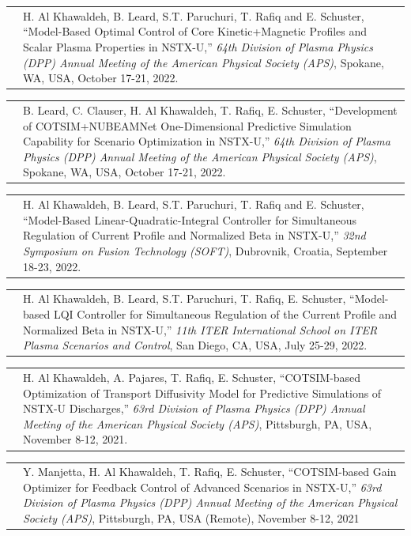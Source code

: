 \documentclass[11pt,letterpaper]{article}
\makeatletter
\newcommand{\CVSection}[1]{%
  \vspace{0.4em}
  \noindent
  \begin{tabularx}{\textwidth}{@{}p{0.82in}@{\hspace{0.14in}}X@{}}
    \raisebox{-1.45ex}{\color{rulecolor}\rule{0.82in}{4.2pt}} &
    {\fontsize{14}{16}\selectfont\color{cvcolor}#1}\\
  \end{tabularx}
  \vspace{0.55em}
}
\newcommand{\CVItem}[2]{%
  \begin{tabularx}{\textwidth}{@{}p{0.83in}@{\hspace{0.15in}}X@{}}
    \raggedleft{#1} & #2\\[3pt]
  \end{tabularx}
}
\makeatother
\begin{document}
\CVItem{[17]}{H. Al Khawaldeh, B. Leard, S.T. Paruchuri, T. Rafiq and E. Schuster, ``Model-Based Optimal Control of Core Kinetic+Magnetic Profiles and Scalar Plasma Properties in NSTX-U,'' \textit{64th Division of Plasma Physics (DPP) Annual Meeting of the American Physical Society (APS)}, Spokane, WA, USA, October 17-21, 2022.}

\CVItem{[18]}{B. Leard, C. Clauser, H. Al Khawaldeh, T. Rafiq, E. Schuster, ``Development of COTSIM+NUBEAMNet One-Dimensional Predictive Simulation Capability for Scenario Optimization in NSTX-U,'' \textit{64th Division of Plasma Physics (DPP) Annual Meeting of the American Physical Society (APS)}, Spokane, WA, USA, October 17-21, 2022.}

\CVItem{[19]}{H. Al Khawaldeh, B. Leard, S.T. Paruchuri, T. Rafiq and E. Schuster, ``Model-Based Linear-Quadratic-Integral Controller for Simultaneous Regulation of Current Profile and Normalized Beta in NSTX-U,'' \textit{32nd Symposium on Fusion Technology (SOFT)}, Dubrovnik, Croatia, September 18-23, 2022.}

\CVItem{[20]}{H. Al Khawaldeh, B. Leard, S.T.  Paruchuri, T. Rafiq, E. Schuster, ``Model-based LQI Controller for Simultaneous Regulation of the Current Profile and Normalized Beta in NSTX-U,'' \textit{11th ITER International School on ITER Plasma Scenarios and Control}, San Diego, CA, USA, July 25-29, 2022.}

\CVItem{[21]}{H. Al Khawaldeh, A. Pajares, T. Rafiq, E. Schuster, ``COTSIM-based Optimization of Transport Diffusivity Model for Predictive Simulations of NSTX-U Discharges,'' \textit{63rd Division of Plasma Physics (DPP) Annual Meeting of the American Physical Society (APS)}, Pittsburgh, PA, USA, November 8-12, 2021. }

\CVItem{[22]}{Y. Manjetta, H. Al Khawaldeh, T. Rafiq, E. Schuster, ``COTSIM-based Gain Optimizer for Feedback Control of Advanced Scenarios in NSTX-U,'' \textit{63rd Division of Plasma Physics (DPP) Annual Meeting of the American Physical Society (APS)}, Pittsburgh, PA, USA (Remote), November 8-12, 2021 }




\end{document}
